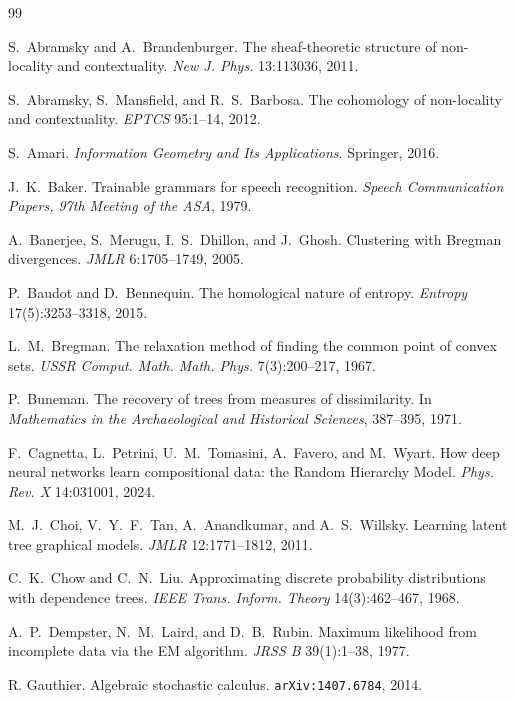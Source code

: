 \begin{thebibliography}{99}

 S.~Abramsky and A.~Brandenburger.
  The sheaf-theoretic structure of non-locality and contextuality.
  \emph{New J. Phys.} 13:113036, 2011.

 S.~Abramsky, S.~Mansfield, and R.~S.~Barbosa.
  The cohomology of non-locality and contextuality.
  \emph{EPTCS} 95:1--14, 2012.

 S.~Amari. \emph{Information Geometry and Its
  Applications}. Springer, 2016.

 J.~K.~Baker. Trainable grammars for speech recognition.
  \emph{Speech Communication Papers, 97th Meeting of the ASA}, 1979.

 A.~Banerjee, S.~Merugu, I.~S.~Dhillon, and J.~Ghosh.
  Clustering with Bregman divergences. \emph{JMLR} 6:1705--1749, 2005.

 P.~Baudot and D.~Bennequin. The homological nature of entropy.
  \emph{Entropy} 17(5):3253--3318, 2015.

 L.~M.~Bregman. The relaxation method of finding the
  common point of convex sets. \emph{USSR Comput. Math. Math. Phys.}
  7(3):200--217, 1967.

 P.~Buneman. The recovery of trees from measures of
  dissimilarity. In \emph{Mathematics in the Archaeological and Historical
  Sciences}, 387--395, 1971.

 F.~Cagnetta, L.~Petrini, U.~M.~Tomasini, A.~Favero, and
  M.~Wyart. How deep neural networks learn compositional data: the Random
  Hierarchy Model. \emph{Phys. Rev. X} 14:031001, 2024.

 M.~J.~Choi, V.~Y.~F.~Tan, A.~Anandkumar, and A.~S.~Willsky.
  Learning latent tree graphical models. \emph{JMLR} 12:1771--1812, 2011.

 C.~K.~Chow and C.~N.~Liu. Approximating discrete
  probability distributions with dependence trees. \emph{IEEE Trans. Inform.
  Theory} 14(3):462--467, 1968.

 A.~P.~Dempster, N.~M.~Laird, and D.~B.~Rubin. Maximum
  likelihood from incomplete data via the EM algorithm. \emph{JRSS B}
  39(1):1--38, 1977.

 R. Gauthier. Algebraic stochastic calculus.
  \texttt{arXiv:1407.6784}, 2014.


\end{thebibliography}
